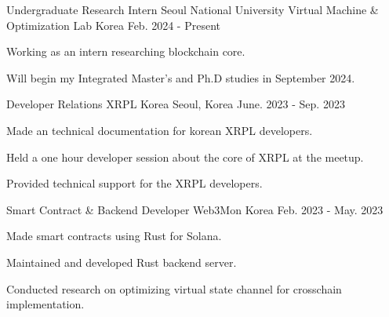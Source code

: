 


\begin{cventries}


\cventry
{Undergraduate Research Intern} %
{Seoul National University Virtual Machine \& Optimization Lab} %
{Korea} %
{Feb. 2024 - Present} %
{ %
\begin{cvitems}
\item {Working as an intern researching blockchain core.}
\item {Will begin my Integrated Master's and Ph.D studies in September 2024.}
\end{cvitems}
}


\cventry
{Developer Relations} %
{XRPL Korea} %
{Seoul, Korea} %
{June. 2023 - Sep. 2023} %
{ %
\begin{cvitems}
\item {Made an technical documentation for korean XRPL developers.}
\item {Held a one hour developer session about the core of XRPL at the meetup.}
\item {Provided technical support for the XRPL developers.}
\end{cvitems}
}


\cventry
{Smart Contract \& Backend Developer} %
{Web3Mon} %
{Korea} %
{Feb. 2023 - May. 2023} %
{ %
\begin{cvitems}
\item {Made smart contracts using Rust for Solana.}
\item {Maintained and developed Rust backend server.}
\item {Conducted research on optimizing virtual state channel for crosschain implementation.}
\end{cvitems}
}


\end{cventries}
